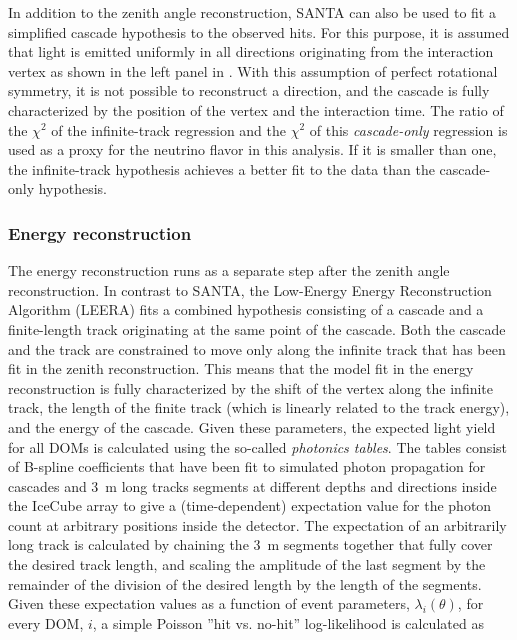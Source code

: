 In addition to the zenith angle reconstruction, SANTA can also be used to fit a simplified cascade hypothesis to the observed hits. For this purpose, it is assumed that light is emitted uniformly in all directions originating from the interaction vertex as shown in the left panel in . With this assumption of perfect rotational symmetry, it is not possible to reconstruct a direction, and the cascade is fully characterized by the position of the vertex and the interaction time. The ratio of the $\chi^2$ of the infinite-track regression and the $\chi^2$ of this \emph{cascade-only} regression is used as a proxy for the neutrino flavor in this analysis. If it is smaller than one, the infinite-track hypothesis achieves a better fit to the data than the cascade-only hypothesis.

\subsubsection{Energy reconstruction}
\label{sec:leera}
The energy reconstruction runs as a separate step after the zenith angle reconstruction. In contrast to \textsc{SANTA}, the Low-Energy Energy Reconstruction Algorithm (LEERA)\cite{Terliuk2018Measurement} fits a combined hypothesis consisting of a cascade and a finite-length track originating at the same point of the cascade. Both the cascade and the track are constrained to move only along the infinite track that has been fit in the zenith reconstruction. This means that the model fit in the energy reconstruction is fully characterized by the shift of the vertex along the infinite track, the length of the finite track (which is linearly related to the track energy), and the energy of the cascade. Given these parameters, the expected light yield for all DOMs is calculated using the so-called \emph{photonics tables}. The tables consist of B-spline coefficients that have been fit to simulated photon propagation for cascades and 3~m long tracks segments at different depths and directions inside the IceCube array to give a (time-dependent) expectation value for the photon count at arbitrary positions inside the detector. The expectation of an arbitrarily long track is calculated by chaining the 3~m segments together that fully cover the desired track length, and scaling the amplitude of the last segment by the remainder of the division of the desired length by the length of the segments. Given these expectation values as a function of event parameters, $\lambda_i(\theta)$, for every DOM, $i$, a simple Poisson ''hit vs. no-hit'' log-likelihood is calculated as
